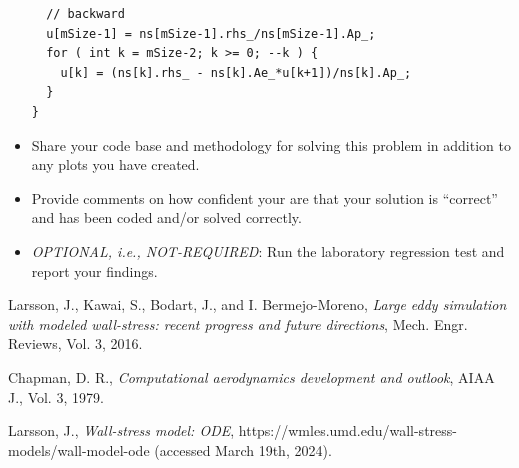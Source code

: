 \documentclass{article}
\begin{document}
\begin{itemize}
\begin{lstlisting}
  // backward
  u[mSize-1] = ns[mSize-1].rhs_/ns[mSize-1].Ap_;
  for ( int k = mSize-2; k >= 0; --k ) {
    u[k] = (ns[k].rhs_ - ns[k].Ae_*u[k+1])/ns[k].Ap_;
  }
}

\end{lstlisting}

\item Share your code base and methodology for solving this problem in addition to any plots you have created.

\item Provide comments on how confident your are that your solution is ``correct'' and has been coded and/or 
solved correctly.

\item \emph{OPTIONAL, i.e., NOT-REQUIRED}: Run the laboratory regression test and report your findings.

\end{itemize}


\begin{thebibliography}{100}

 Larsson, J., Kawai, S., Bodart, J., and I. Bermejo-Moreno, \emph{Large eddy simulation with modeled wall-stress: recent progress and future directions}, Mech. Engr. Reviews, Vol. 3, 2016.

 Chapman, D. R., \emph{Computational aerodynamics development and outlook}, AIAA J., Vol. 3, 1979.

 Larsson, J., \emph{Wall-stress model: ODE}, https://wmles.umd.edu/wall-stress-models/wall-model-ode (accessed March 19th, 2024).

\end{thebibliography}
\end{document}
